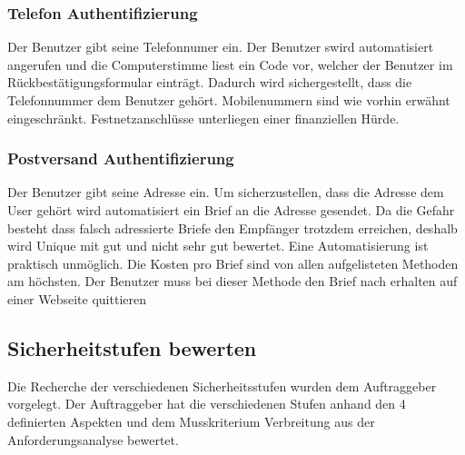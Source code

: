 \subsubsection{Telefon
Authentifizierung}\label{telefon-authentifizierung}

Der Benutzer gibt seine Telefonnumer ein. Der Benutzer swird
automatisiert angerufen und die Computerstimme liest ein Code vor,
welcher der Benutzer im Rückbestätigungsformular einträgt. Dadurch wird
sichergestellt, dass die Telefonnummer dem Benutzer gehört.
Mobilenummern sind wie vorhin erwähnt eingeschränkt. Festnetzanschlüsse
unterliegen einer finanziellen Hürde.

\subsubsection{Postversand
Authentifizierung}\label{postversand-authentifizierung}

Der Benutzer gibt seine Adresse ein. Um sicherzustellen, dass die
Adresse dem User gehört wird automatisiert ein Brief an die Adresse
gesendet. Da die Gefahr besteht dass falsch adressierte Briefe den
Empfänger trotzdem erreichen, deshalb wird Unique mit gut und nicht sehr
gut bewertet. Eine Automatisierung ist praktisch unmöglich. Die Kosten
pro Brief sind von allen aufgelisteten Methoden am höchsten. Der
Benutzer muss bei dieser Methode den Brief nach erhalten auf einer
Webseite quittieren

\subsection{Sicherheitstufen bewerten}\label{sicherheitstufen-bewerten}

Die Recherche der verschiedenen Sicherheitsstufen wurden dem
Auftraggeber vorgelegt. Der Auftraggeber hat die verschiedenen Stufen
anhand den 4 definierten Aspekten und dem Musskriterium Verbreitung aus
der Anforderungsanalyse bewertet.

